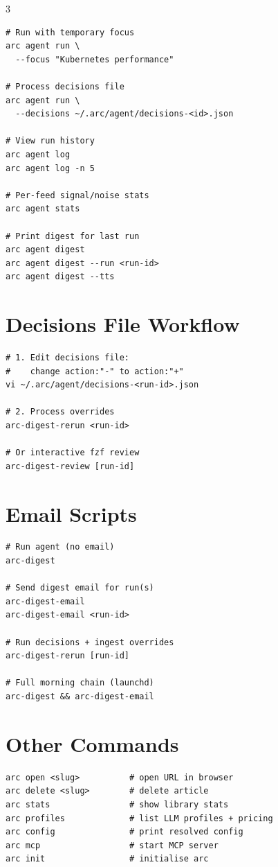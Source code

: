 \documentclass[10pt,a4paper,landscape]{article}
\begin{document}
\begin{multicols}{3}
\begin{lstlisting}
# Run with temporary focus
arc agent run \
  --focus "Kubernetes performance"

# Process decisions file
arc agent run \
  --decisions ~/.arc/agent/decisions-<id>.json

# View run history
arc agent log
arc agent log -n 5

# Per-feed signal/noise stats
arc agent stats

# Print digest for last run
arc agent digest
arc agent digest --run <run-id>
arc agent digest --tts
\end{lstlisting}

\section{Decisions File Workflow}

\begin{lstlisting}
# 1. Edit decisions file:
#    change action:"-" to action:"+"
vi ~/.arc/agent/decisions-<run-id>.json

# 2. Process overrides
arc-digest-rerun <run-id>

# Or interactive fzf review
arc-digest-review [run-id]
\end{lstlisting}

\section{Email Scripts}

\begin{lstlisting}
# Run agent (no email)
arc-digest

# Send digest email for run(s)
arc-digest-email
arc-digest-email <run-id>

# Run decisions + ingest overrides
arc-digest-rerun [run-id]

# Full morning chain (launchd)
arc-digest && arc-digest-email
\end{lstlisting}

\section{Other Commands}

\begin{lstlisting}
arc open <slug>          # open URL in browser
arc delete <slug>        # delete article
arc stats                # show library stats
arc profiles             # list LLM profiles + pricing
arc config               # print resolved config
arc mcp                  # start MCP server
arc init                 # initialise arc
\end{lstlisting}


\end{multicols}
\end{document}
